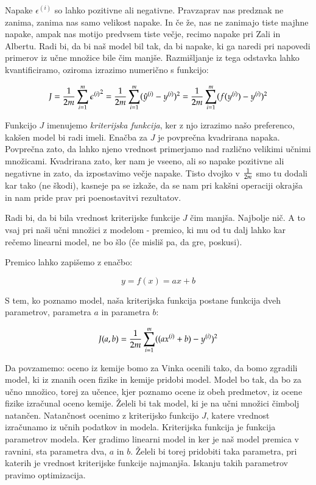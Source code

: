 Napake $\epsilon^{(i)}$ so lahko pozitivne ali negativne.
Pravzaprav nas predznak ne zanima, zanima nas samo velikost napake. In
če že, nas ne zanimajo tiste majhne napake, ampak nas motijo predvsem
tiste večje, recimo napake pri Zali in Albertu. Radi bi, da bi naš
model bil tak, da bi napake, ki ga naredi pri napovedi primerov iz
učne množice bile čim manjše. Razmišljanje iz tega odstavka lahko
kvantificiramo, oziroma izrazimo numerično s funkcijo:

\begin{equation}
J = {1\over 2m}\sum_{i=1}^m {\epsilon^{(i)}}^2 = {1\over 2m}\sum_{i=1}^m
(\hat{y}^{(i)}-y^{(i)})^2 = {1\over 2m}\sum_{i=1}^m (f(y^{(i)})-y^{(i)})^2
\label{eq:jab}
\end{equation}

Funkcijo $J$ imenujemo {\em kriterijska funkcija}, ker z njo izrazimo
našo preferenco, kakšen model bi radi imeli. Enačba za $J$ je
povprečna kvadrirana napaka. Povprečna zato, da lahko njeno vrednost
primerjamo nad različno velikimi učnimi množicami. Kvadrirana zato,
ker nam je vseeno, ali so napake pozitivne ali negativne in zato, da
izpostavimo večje napake. Tisto dvojko v $1\over 2m$ smo tu dodali kar
tako (ne škodi), kasneje pa se izkaže, da se nam pri kakšni operaciji
okrajša in nam pride prav pri poenostavitvi rezultatov.

Radi bi, da bi bila vrednost kriterijske funkcije $J$ čim
manjša. Najbolje nič. A to vsaj pri naši učni množici z modelom -
premico, ki mu od tu dalj lahko kar rečemo linearni model, ne bo šlo
(če misliš pa, da gre, poskusi).

Premico lahko zapišemo z enačbo:

\begin{equation}
  y=f(x)=a x + b
\end{equation}

S tem, ko poznamo model, naša kriterijska funkcija postane funkcija
dveh parametrov, parametra $a$ in parametra $b$:

\begin{equation}
  J(a, b) = {1\over 2m}\sum_{i=1}^m ((a x^{(i)} + b)-y^{(i)})^2
\end{equation}

Da povzamemo: oceno iz kemije bomo za Vinka ocenili tako, da bomo
zgradili model, ki iz znanih ocen fizike in kemije pridobi
model. Model bo tak, da bo za učno množico, torej za učence, kjer
poznamo ocene iz obeh predmetov, iz ocene fizike izračunal oceno
kemije. Želeli bi tak model, ki je na učni množici čimbolj
natančen. Natančnost ocenimo z kriterijsko funkcijo $J$, katere
vrednost izračunamo iz učnih podatkov in modela. Kriterijska funkcija
je funkcija parametrov modela. Ker gradimo linearni model in ker je
naš model premica v ravnini, sta parametra dva, $a$ in $b$. Želeli bi
torej pridobiti taka parametra, pri katerih je vrednost kriterijske
funkcije najmanjša. Iskanju takih parametrov pravimo optimizacija.

